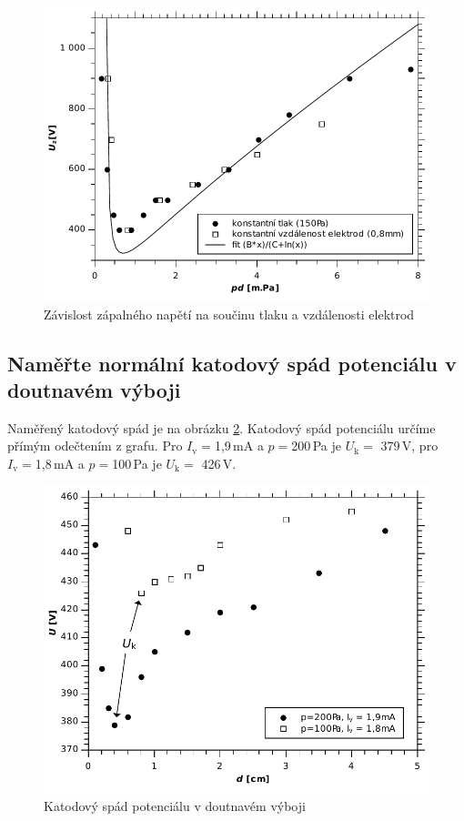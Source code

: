 \documentclass[12pt]{article}
\begin{document}
\begin{figure}[htbp]
\begin{center}
\includegraphics[width=12cm]{Graph1.pdf}
\caption{Závislost zápalného napětí na součinu tlaku a vzdálenosti elektrod}
\label{graph1}
\end{center}
\end{figure}


\subsection{Naměřte normální katodový spád potenciálu v doutnavém výboji}
Naměřený katodový spád je na obrázku \ref{graph2}. Katodový spád potenciálu určíme přímým odečtením z grafu. Pro $I_\mathrm{v} = $1,9\,mA a $p = $200\,Pa je $U_\mathrm{k} =$ 379\,V, pro $I_\mathrm{v} = $1,8\,mA a $p = $100\,Pa je $U_\mathrm{k} =$ 426\,V.

\begin{figure}[htbp]
\begin{center}
\includegraphics[width=12cm]{Graph2.pdf}
\caption{Katodový spád potenciálu v doutnavém výboji}
\label{graph2}
\end{center}
\end{figure}
\end{document}
